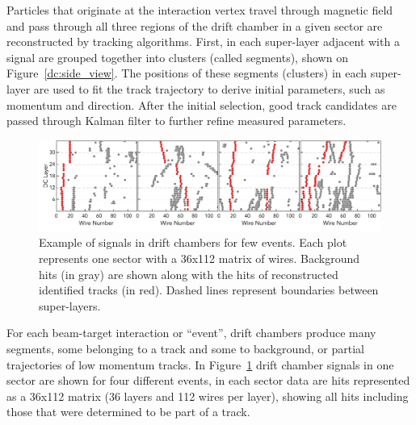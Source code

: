 Particles that originate at the interaction vertex travel through magnetic field and pass through all three regions of the drift chamber in a given sector are reconstructed by tracking algorithms. First, in each super-layer adjacent  with a signal are grouped together into clusters (called segments), shown on Figure~\ref{dc:side_view}. 
 The positions of these segments (clusters) in each super-layer are used to fit the track trajectory to derive initial parameters, such as momentum and direction. After the initial selection, good track candidates are passed through Kalman filter to further refine measured parameters.

\begin{figure}[!ht]
\begin{center}
 \includegraphics[width=6.2in]{images/figure_dc_examples.pdf}
\caption {Example of signals in drift chambers for few events. Each plot represents one sector with a 36x112 matrix of wires. Background hits (in gray) are shown along with the hits of reconstructed identified tracks (in red). Dashed lines represent boundaries between super-layers.}
 \label{dc:events_sector}
 \end{center}
\end{figure}

For each beam-target interaction or ``event'', drift chambers produce many segments, some belonging to a track and some to background, or partial trajectories of low momentum tracks. In Figure~\ref{dc:events_sector} drift chamber signals in one sector are shown for four different  events, in each sector data are hits represented as a 36x112 matrix (36 layers and 112 wires per layer), showing all hits including those that were determined to be part of a track. 


